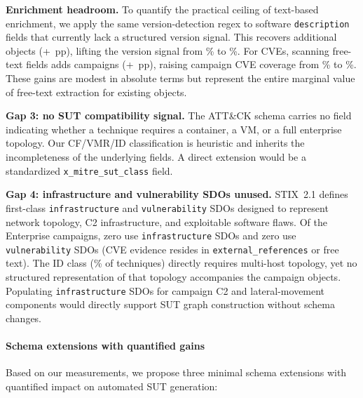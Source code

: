\documentclass[sigconf,anonymous,review]{acmart}
\newcommand{\stix}{STIX\xspace}
\newcommand{\attack}{ATT\&CK\xspace}
\newcommand{\myparagraph}[1]{\textbf{#1.}\hspace{0.5em}}
\begin{document}
\myparagraph{Enrichment headroom}
To quantify the practical ceiling of text-based enrichment, we apply the same version-detection regex to software \texttt{description} fields that currently lack a structured version signal. This recovers \softwareversionenrichmentgaincount{} additional objects (+\softwareversionenrichmentgainpp{}~pp), lifting the version signal from \softwarewithversionsignalpercentage\% to \softwareversionenrichedtotalpct\%. For CVEs, scanning free-text fields adds \entcampaignswithcveenrichmentgaincount{} campaigns (+\entcampaignswithcveenrichmentgainpp{}~pp), raising campaign CVE coverage from \entcampaignswithcvestructuredpct\% to \entcampaignswithcvepct\%. These gains are modest in absolute terms but represent the entire marginal value of free-text extraction for existing objects.

\myparagraph{Gap 3: no SUT compatibility signal}
The \attack{} schema carries no field indicating whether a technique requires a container, a VM, or a full enterprise topology. Our CF/VMR/ID classification is heuristic and inherits the incompleteness of the underlying fields. A direct extension would be a standardized \texttt{x\_mitre\_sut\_class} field.

\myparagraph{Gap 4: infrastructure and vulnerability SDOs unused}
\stix{}~2.1 defines first-class \texttt{infrastructure} and \texttt{vulnerability} SDOs designed to represent network topology, C2 infrastructure, and exploitable software flaws. Of the \enterpriseactivecampaigncount{} Enterprise campaigns, zero use \texttt{infrastructure} SDOs and zero use \texttt{vulnerability} SDOs (CVE evidence resides in \texttt{external\_references} or free text). The ID class (\compatibilityinfrastructuredependentpercentage\% of techniques) directly requires multi-host topology, yet no structured representation of that topology accompanies the campaign objects. Populating \texttt{infrastructure} SDOs for campaign C2 and lateral-movement components would directly support SUT graph construction without schema changes.

\paragraph{Schema extensions with quantified gains}

Based on our measurements, we propose three minimal schema extensions with quantified impact on automated SUT generation:
\end{document}
